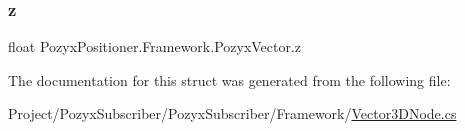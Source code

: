 \mbox{\label{struct_pozyx_positioner_1_1_framework_1_1_pozyx_vector_a1b44279d1786ffde514d431c1521c230}} 
\subsubsection{\texorpdfstring{z}{z}}
{\footnotesize\ttfamily float Pozyx\+Positioner.\+Framework.\+Pozyx\+Vector.\+z}



The documentation for this struct was generated from the following file\+:\begin{DoxyCompactItemize}
\item 
Project/\+Pozyx\+Subscriber/\+Pozyx\+Subscriber/\+Framework/\hyperlink{_vector3_d_node_8cs}{Vector3\+D\+Node.\+cs}\end{DoxyCompactItemize}
